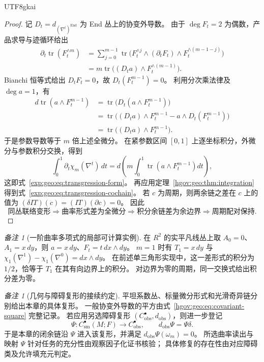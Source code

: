 \documentclass[12pt,a4paper,openany,notitlepage]{report}
\theoremstyle{plain}
\theoremstyle{definition}
\theoremstyle{remark}
\newtheorem{remark}[theorem]{备注}
\def\mathcal#1{#1}\def\mathsf#1{#1}\def\mathbb#1{#1}%
\begin{document}
\begin{CJK*}{UTF8}{gkai}
\begin{proof}
记 $\mathcal D_t=d_{(\nabla^t)^{\operatorname{End}}}$ 为 End 丛上的协变外导数。
由于 $\deg F_t=2$ 为偶数，产品求导与迹循环给出
\[
\begin{aligned}
\partial_t\operatorname{tr}(F_t^{\wedge m})
&=\sum_{j=0}^{m-1}
\operatorname{tr}\bigl(F_t^{\wedge j}\wedge(\partial_tF_t)
\wedge F_t^{\wedge(m-1-j)}\bigr)\\
&=m\operatorname{tr}\bigl((\mathcal D_ta)\wedge F_t^{\wedge(m-1)}\bigr).
\end{aligned}
\]
Bianchi 恒等式给出 $\mathcal D_tF_t=0$，故 $\mathcal D_t(F_t^{m-1})=0$。
利用分次乘法律及 $\deg a=1$，有
\[
\begin{aligned}
d\operatorname{tr}(a\wedge F_t^{m-1})
&=\operatorname{tr}\bigl(\mathcal D_t(a\wedge F_t^{m-1})\bigr)\\
&=\operatorname{tr}\bigl((\mathcal D_ta)\wedge F_t^{m-1}
-a\wedge\mathcal D_t(F_t^{m-1})\bigr)\\
&=\operatorname{tr}\bigl((\mathcal D_ta)\wedge F_t^{m-1}\bigr).
\end{aligned}
\]
于是参数导数等于 $m$ 倍上述全微分。
在紧参数区间 $[0,1]$ 上逐坐标积分，外微分与参数积分交换，得到
\[
\int_0^1\partial_t\chi_m(\nabla^t)\,dt
=d\left(m\int_0^1\operatorname{tr}(a\wedge F_t^{m-1})dt\right),
\]
这即式~\eqref{exp:geo:eq:transgression-form}。
再应用定理~\ref{hgov:geo:thm:integration} 得到式~\eqref{exp:geo:eq:transgression-cochain}。
若 $c$ 为周期，则两余链之差在 $c$ 上的值为
$(\delta I\mathsf T)(c)=(I\mathsf T)(\partial c)=0$。
因此
\[
\text{同丛联络变形}\Longrightarrow\text{曲率形式差为全微分}
\Longrightarrow\text{积分余链差为余边界}
\Longrightarrow\text{周期配对保持}.
\]
\end{proof}

\begin{remark}[一阶曲率多项式的局部可计算实例]
在 $\mathbb R^2$ 的实平凡线丛上取 $A_0=0$、$A_1=x\,dy$，则
$a=x\,dy$、$F_t=t\,dx\wedge dy$。
$m=1$ 时有
$\mathsf T_1=x\,dy$ 与 $\chi_1(\nabla^1)-\chi_1(\nabla^0)=dx\wedge dy$。
在前述单三角形实现中，这一差形式的积分为 $1/2$，恰等于
$\mathsf T_1$ 在其有向边界上的积分。
对边界为零的周期，同一交换式给出积分差为零。
\end{remark}

\begin{remark}[几何与障碍复形的接续约定]
平坦系数丛、标量微分形式和光滑奇异链分别给出本章的具体复形。
一般协变外导数的平方由式~\eqref{hgov:geo:eq:covariant-square} 完整记录。
若应用另选障碍复形 $(C_{\mathrm{obs}}^\bullet,d_{\mathrm{obs}})$，则进一步登记
\[
\Psi:C_{\mathrm{sm}}^\bullet(M;\mathbb F)
\longrightarrow C_{\mathrm{obs}}^\bullet,
\qquad d_{\mathrm{obs}}\Psi=\Psi\delta.
\]
于是本章的闭余链沿 $\Psi$ 进入该复形，并满足
$d_{\mathrm{obs}}\Psi(\omega_m)=0$。
所选曲率读出与映射 $\Psi$ 针对任务的充分性由观察因子化证书核验；
具体修复的存在性由对应障碍类及允许填充元判定。
\end{remark}


\end{CJK*}
\end{document}
